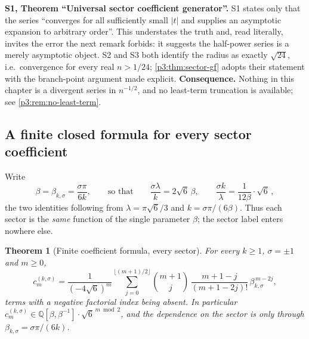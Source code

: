 \documentclass[11pt,a4paper,oneside]{book}
\theoremstyle{plain}
\newtheorem{theorem}{Theorem}[chapter]
\theoremstyle{definition}
\theoremstyle{remark}
\newcommand{\Rat}{\mathbb{Q}}
\begin{document}
\begin{repairbox}
\textbf{S1, Theorem ``Universal sector coefficient generator''.} S1 states only that the series
``converges for all sufficiently small $|t|$ and supplies an asymptotic expansion to arbitrary
order''. This understates the truth and, read literally, invites the error the next remark
forbids: it suggests the half-power series is a merely asymptotic object. S2 and S3 both identify
the radius as exactly $\sqrt{24}$, i.e.\ convergence for every real $n>1/24$;
\cref{p3:thm:sector-gf} adopts their statement with the branch-point argument made explicit.
\textbf{Consequence.} Nothing in this chapter is a divergent series in $n^{-1/2}$, and no
least-term truncation is available; see \cref{p3:rem:no-least-term}.
\end{repairbox}

\subsection{A finite closed formula for every sector coefficient}

Write
\begin{equation}\label{p3:eq:b-parameter}
 \beta=\beta_{k,\sigma}=\frac{\sigma\pi}{6k},
 \qquad\text{so that}\qquad
 \frac{\sigma\lambda}{k}=2\sqrt6\,\beta,
 \qquad
 \frac{\sigma k}{\lambda}=\frac{1}{12\beta}\cdot\sqrt{6}\,,
\end{equation}
the two identities following from $\lambda=\pi\sqrt6/3$ and $k=\sigma\pi/(6\beta)$. Thus each
sector is the \emph{same} function of the single parameter $\beta$; the sector label enters
nowhere else.

\begin{theorem}[Finite coefficient formula, every sector]\label{p3:thm:c-finite}
For every $k\ge1$, $\sigma=\pm1$ and $m\ge0$,
\begin{equation}\label{p3:eq:c-finite}
 c^{(k,\sigma)}_{m}
 =\frac1{(-4\sqrt6)^{m}}
 \sum_{j=0}^{\lfloor(m+1)/2\rfloor}
 \binom{m+1}{j}\,\frac{m+1-j}{(m+1-2j)!}\,
 \beta_{k,\sigma}^{\,m-2j},
\end{equation}
terms with a negative factorial index being absent. In particular
$c^{(k,\sigma)}_{m}\in\Rat[\beta,\beta^{-1}]\cdot\sqrt6^{\,m\bmod 2}$, and the dependence on the
sector is only through $\beta_{k,\sigma}=\sigma\pi/(6k)$.
\end{theorem}
\end{document}

